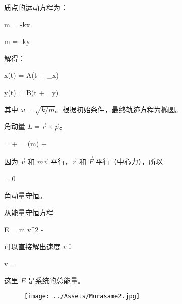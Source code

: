 质点的运动方程为：
\begin{cphosequation}[2]
m = -kx
\end{cphosequation}
\begin{cphosequation}[2]
m = -ky
\end{cphosequation}
解得：
\begin{cphosequation}[3]
x(t) = A\cos(\omega t + \phi_x)
\end{cphosequation}
\begin{cphosequation}[3]
y(t) = B\sin(\omega t + \phi_y)
\end{cphosequation}
其中 $\omega = \sqrt{k/m}$。根据初始条件，最终轨迹方程为椭圆。

角动量 $L = \vec{r} \times \vec{p}$。
\begin{cphosequation}[5]
 =  \times {} +  \times {} =  \times (m) +  \times {}
\end{cphosequation}
因为 $\vec{v}$ 和 $m\vec{v}$ 平行，$\vec{r}$ 和 $\vec{F}$ 平行（中心力），所以
\begin{cphosequation}[5]
 = 0
\end{cphosequation}
角动量守恒。

从能量守恒方程
\begin{cphosequation}[10]
E = m v^2 - 
\end{cphosequation}
可以直接解出速度 $v$：
\begin{cphosequation}[10]
v = 
\end{cphosequation}
这里 $E$ 是系统的总能量。
\begin{figure}[H]
\centering
\texttt{[image: ../Assets/Murasame2.jpg]}
\label{fig:ans1}
\end{figure}
